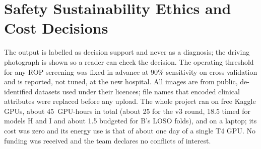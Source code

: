 \section{Safety Sustainability Ethics and Cost Decisions}
The output is labelled as decision support and never as a diagnosis; the driving photograph is shown so a reader can check the decision. The operating threshold for any-ROP screening was fixed in advance at 90\% sensitivity on cross-validation and is reported, not tuned, at the new hospital. All images are from public, de-identified datasets used under their licences; file names that encoded clinical attributes were replaced before any upload. The whole project ran on free Kaggle GPUs, about 45~GPU-hours in total (about 25 for the v3 round, 18.5 timed for models H and I and about 1.5 budgeted for B's LOSO folds), and on a laptop; its cost was zero and its energy use is that of about one day of a single T4 GPU. No funding was received and the team declares no conflicts of interest.
